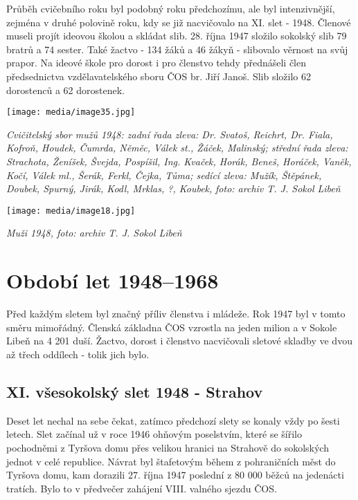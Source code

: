 Průběh cvičebního roku byl podobný roku předchozímu, ale byl
intenzivnější, zejména v druhé polovině roku, kdy se již nacvičovalo na
XI. slet - 1948. Členové museli projít ideovou školou a skládat slib.
28. října 1947 složilo sokolský slib 79 bratrů a 74 sester. Také žactvo
- 134 žáků a 46 žákyň - slibovalo věrnost na svůj prapor. Na ideové
škole pro dorost i pro členstvo tehdy přednášeli člen předsednictva
vzdělavatelského sboru ČOS br. Jiří Janoš. Slib složilo 62 dorostenců a
62 dorostenek.

\texttt{[image: media/image35.jpg]}

\emph{Cvičitelský sbor mužů 1948: zadní řada zleva: Dr. Svatoš, Reichrt,
Dr. Fiala, Kofroň, Houdek, Čumrda, Něměc, Válek st., Žáček, Malinský;
střední řada zleva: Strachota, Ženíšek, Švejda, Pospíšil, Ing. Kvaček,
Horák, Beneš, Horáček, Vaněk, Kočí, Válek ml., Šerák, Ferkl, Čejka,
Tůma; sedící zleva: Mužík, Štěpánek, Doubek, Spurný, Jirák, Kodl,
Mrklas, ?, Koubek,} \emph{foto: archiv T. J. Sokol Libeň}

\texttt{[image: media/image18.jpg]}

\emph{Muži 1948, foto: archiv T. J. Sokol Libeň}

\section{Období let 1948--1968}\label{obdobuxed-let-19481968}

Před každým sletem byl značný příliv členstva i mládeže. Rok 1947 byl v
tomto směru mimořádný. Členská základna ČOS vzrostla na jeden milion a v
Sokole Libeň na 4 201 duší. Žactvo, dorost i členstvo nacvičovali
sletové skladby ve dvou až třech oddílech - tolik jich bylo.

\subsection{XI. všesokolský slet 1948 -
Strahov}\label{xi.-vux161esokolskuxfd-slet-1948---strahov}

Deset let nechal na sebe čekat, zatímco předchozí slety se konaly vždy
po šesti letech. Slet začínal už v roce 1946 ohňovým poselstvím, které
se šířilo pochodněmi z Tyršova domu přes velikou hranici na Strahově do
sokolských jednot v celé republice. Návrat byl štafetovým během z
pohraničních měst do Tyršova domu, kam dorazili 27. října 1947 poslední
z 80 000 běžců na jedenácti tratích. Bylo to v předvečer zahájení VIII.
valného sjezdu ČOS.

